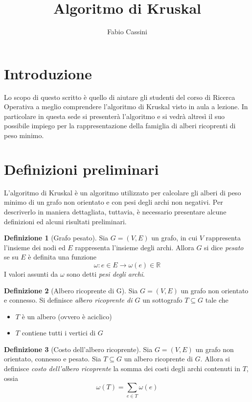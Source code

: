 \documentclass[12pt,a4paper,twoside]{article}
\title{Algoritmo di Kruskal}
\author{Fabio Cassini}
\theoremstyle{definition}
\newtheorem{definition}{Definizione}[section]
\theoremstyle{definition}
\theoremstyle{theorem}
\begin{document}
	\maketitle
	\section{Introduzione}
	Lo scopo di questo scritto è quello di aiutare gli studenti del corso di Ricerca Operativa a meglio comprendere l'algoritmo di Kruskal visto in aula a lezione. In particolare in questa sede si presenterà l'algoritmo e si vedrà altresì il suo possibile impiego per la rappresentazione della famiglia di alberi ricoprenti di peso minimo.
	
	\section{Definizioni preliminari}
	L'algoritmo di Kruskal è un algoritmo utilizzato per calcolare gli alberi di peso minimo di un grafo non orientato e con pesi degli archi non negativi. Per descriverlo in maniera dettagliata, tuttavia, è necessario presentare alcune definizioni ed alcuni risultati preliminari.
	\begin{definition}[Grafo pesato]
		Sia $G=(V,E)$ un grafo, in cui $V$ rappresenta l'insieme dei nodi ed $E$ rappresenta l'insieme degli archi. Allora $G$ si dice \emph{pesato} se su $E$ è definita una funzione
		\begin{equation}
		\omega{} : e \in E \rightarrow \omega(e) \in \mathbb{R}
		\end{equation}
		I valori assunti da $\omega$ sono detti \emph{pesi degli archi}.
	\end{definition}
	\begin{definition}[Albero ricoprente di G]
		Sia $G=(V,E)$ un grafo non orientato e connesso. Si definisce \emph{albero ricoprente di $G$} un sottografo $T \subseteq G$ tale che
		\begin{itemize}
			\item $T$ è un albero (ovvero è aciclico)
			\item $T$ contiene tutti i vertici di $G$
		\end{itemize}
	\end{definition}
	\begin{definition}[Costo dell'albero ricoprente]
		Sia $G=(V,E)$ un grafo non orientato, connesso e pesato. Sia $T\subseteq G$ un albero ricoprente di $G$. Allora si definisce \emph{costo dell'albero ricoprente} la somma dei costi degli archi contenuti in $T$, ossia
		\begin{equation}
		\omega(T) = \sum_{e\in{}T}\omega(e)
		\end{equation}
	\end{definition}
\end{document}
